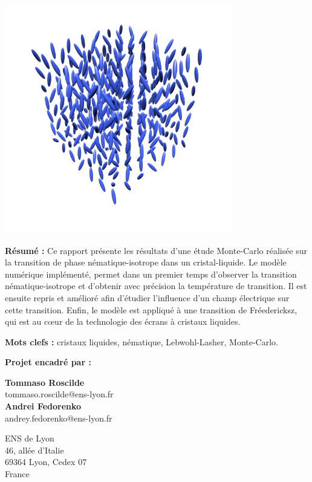 \documentclass[11pt,a4paper]{article}
\numberwithin{equation}{section}
\begin{document}
\begin{titlepage}
\begin{center}
\includegraphics[height=10cm]{figures/cristaux_liquides.png} 
\end{center} 
\vspace{-0.5cm}

\textbf{Résumé :} 
Ce rapport présente les résultats d'une étude Monte-Carlo réalisée sur la transition de phase nématique-isotrope dans un cristal-liquide. Le modèle numérique implémenté, permet dans un premier temps d'observer la transition nématique-isotrope et d'obtenir avec précision la température de transition. Il est ensuite repris et amélioré afin d'étudier l'influence d'un champ électrique sur cette transition. Enfin, le modèle est appliqué à une transition de Fréedericksz, qui est au cœur de la technologie des écrans à cristaux liquides.
\vspace{0.3cm}

\textbf{Mots clefs :} cristaux liquides, nématique, Lebwohl-Lasher, Monte-Carlo.
\vspace{0.3cm}

\textbf{Projet encadré par :} 

\begin{center}
\begin{multicols}{2}

{\bf Tommaso Roscilde } \\
tommaso.roscilde@ens-lyon.fr \\

{\bf Andrei Fedorenko} \\
andrey.fedorenko@ens-lyon.fr\\
\end{multicols}

ENS de Lyon\\
46, allée d'Italie\\ 69364 Lyon, Cedex 07\\ France



\end{center}

\end{titlepage}
\end{document}
